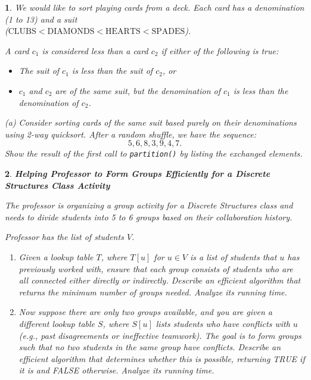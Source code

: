 \documentclass[%
addpoints]{exam}
\theoremstyle{problem}
\newtheorem{p}{}
\begin{document}
\begin{p}
We would like to sort playing cards from a deck. Each card has a denomination (1 to 13) and a suit\\ (\(\text{CLUBS} < \text{DIAMONDS} < \text{HEARTS} < \text{SPADES}\)).  

A card \( c_1 \) is considered less than a card \( c_2 \) if either of the following is true:
\begin{itemize}
    \item The suit of \( c_1 \) is less than the suit of \( c_2 \), or
    \item \( c_1 \) and \( c_2 \) are of the same suit, but the denomination of \( c_1 \) is less than the denomination of \( c_2 \).
\end{itemize}

(a) Consider sorting cards of the same suit based purely on their denominations using 2-way quicksort. After a random shuffle, we have the sequence:  
\[ 5, 6, 8, 3, 9, 4, 7. \]  
Show the result of the first call to \texttt{partition()} by listing the exchanged elements.  
\hfill\end{p}

\newpage

\begin{p}
\textbf{Helping Professor to Form Groups Efficiently for a Discrete Structures Class Activity}  

The professor is organizing a group activity for a Discrete Structures class and needs to divide students into 5 to 6 groups based on their collaboration history.  

Professor has the list of students \( V \).
\begin{enumerate}[label=\alph*)]
    \item Given a lookup table \( T \), where \( T[u] \) for \( u \in V \) is a list of students that \( u \) has previously worked with, ensure that each group consists of students who are all connected either directly or indirectly. Describe an efficient algorithm that returns the minimum number of groups needed. Analyze its running time. 
    \item Now suppose there are only two groups available, and you are given a different lookup table \( S \), where \( S[u] \) lists students who have conflicts with \( u \) (e.g., past disagreements or ineffective teamwork). The goal is to form groups such that no two students in the same group have conflicts. Describe an efficient algorithm that determines whether this is possible, returning TRUE if it is and FALSE otherwise. Analyze its running time.  
\end{enumerate}
\hfill\end{p}
\end{document}

